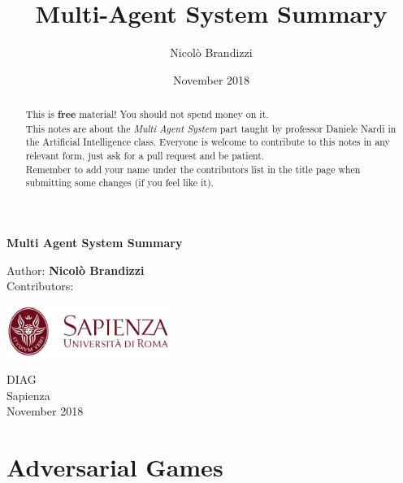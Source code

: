 \documentclass[10pt,a4paper]{article}
\author{Nicolò Brandizzi}
\title{Multi-Agent System Summary}
\date{November 2018}
\begin{document}
\begin{titlepage}
    \begin{center}
        \vspace*{1cm}
        
        \Huge
        \textbf{Multi Agent System Summary}
        
        
        \vspace{1.5cm}
        
        Author:
        \textbf{Nicolò Brandizzi}\\
        \vspace{0.5cm}
        \Large
        Contributors:
        \textbf{}%
        
        \vfill
        
        \includegraphics[width=0.4\textwidth]{images/sapienza_logo.jpg}


        
        \vfill
        
  

        \vspace{0.8cm}
        
        
        \Large
        DIAG\\
        Sapienza\\
        November 2018

    \end{center}
\end{titlepage}


\tableofcontents
\newpage
\begin{abstract}
This is \textbf{free} material! You should not spend money on it.\\
This notes are about the \textit{Multi Agent System} part taught by professor Daniele Nardi in the Artificial Intelligence class. Everyone is welcome to contribute to this notes in any relevant form, just ask for a pull request and be patient.\\ Remember to add your name under the contributors list in the title page when submitting some changes (if you feel like it).
\end{abstract}



\tableofcontents
\newpage


\section{Adversarial Games}
\end{document}
